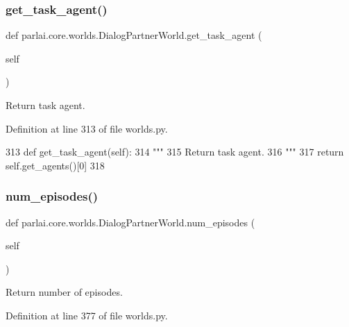 \subsubsection{\texorpdfstring{get\+\_\+task\+\_\+agent()}{get\_task\_agent()}}
{\footnotesize\ttfamily def parlai.\+core.\+worlds.\+Dialog\+Partner\+World.\+get\+\_\+task\+\_\+agent (\begin{DoxyParamCaption}\item[{}]{self }\end{DoxyParamCaption})}

\begin{DoxyVerb}Return task agent.
\end{DoxyVerb}
 

Definition at line 313 of file worlds.\+py.


\begin{DoxyCode}
313     \textcolor{keyword}{def }get\_task\_agent(self):
314         \textcolor{stringliteral}{"""}
315 \textcolor{stringliteral}{        Return task agent.}
316 \textcolor{stringliteral}{        """}
317         \textcolor{keywordflow}{return} self.get\_agents()[0]
318 
\end{DoxyCode}
\mbox{\label{classparlai_1_1core_1_1worlds_1_1DialogPartnerWorld_ab34285faaee3830fbf1d9d53869ec47c}} 
\subsubsection{\texorpdfstring{num\+\_\+episodes()}{num\_episodes()}}
{\footnotesize\ttfamily def parlai.\+core.\+worlds.\+Dialog\+Partner\+World.\+num\+\_\+episodes (\begin{DoxyParamCaption}\item[{}]{self }\end{DoxyParamCaption})}

\begin{DoxyVerb}Return number of episodes.
\end{DoxyVerb}
 

Definition at line 377 of file worlds.\+py.


